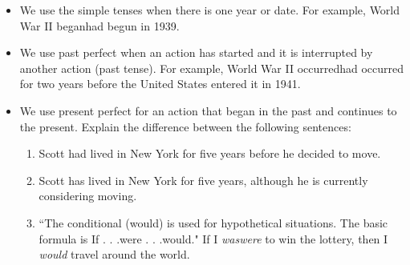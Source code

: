 \begin{itemize}
\item{We use the simple tenses when there is one year or date. For example, World War II
began\/had begun in 1939.}
\item{We use past perfect when an action has started and it is interrupted by another action (past
tense). For example, World War II occurred\/had occurred for two years before the United
States entered it in 1941.}
\item{We use present perfect for an action that began in the past and continues to the present.
Explain the difference between the following sentences:}

\begin{enumerate}
\item{Scott had lived in New York for five years before he decided to move.}
\item{Scott has lived in New York for five years, although he is currently considering moving.}
\item{``The conditional (would) is used for hypothetical situations. The basic formula is \/If . . .were
. . .would." If I \textit{was\/were} to win the lottery, then I \textit{would} travel around the world.}
\end{enumerate}

\end{itemize}
